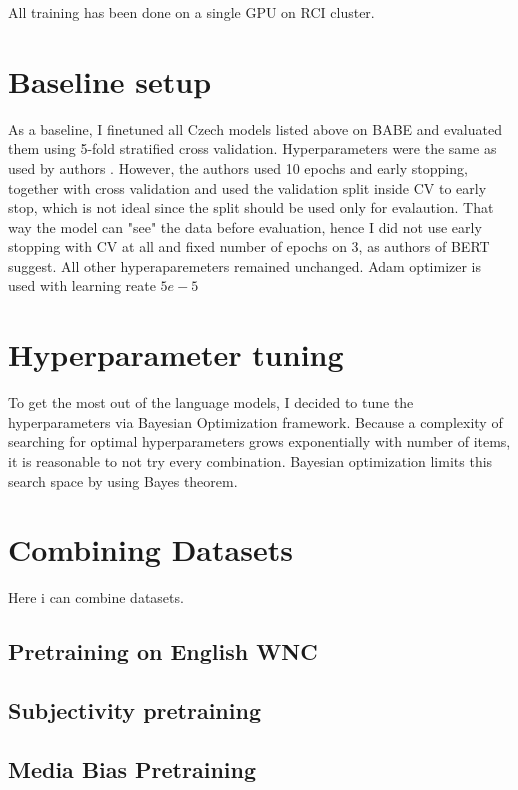  
 
 
 
All training has been done on a single GPU on RCI cluster.
 \section{Baseline setup}
 As a baseline, I finetuned all Czech models listed above on BABE and evaluated them using 5-fold stratified cross validation. Hyperparameters were the same as used by authors \cite{Spinde2021MBIC}. However, the authors used 10 epochs and early stopping, together with cross validation and used the validation split inside CV to early stop, which is not ideal since the split should be used only for evalaution. That way the model can "see" the data before evaluation, hence I did not use early stopping with CV at all and fixed number of epochs on 3, as authors of BERT \cite{devlin2019bert} suggest. 
 All other hyperaparemeters remained unchanged. Adam optimizer is used with learning reate $5e-5$
 
 
 
 
 
 \section{Hyperparameter tuning}
 To get the most out of the language models, I decided to tune the hyperparameters via Bayesian Optimization framework. Because a complexity of searching for optimal hyperparameters grows exponentially with number of items, it is reasonable to not try every combination. Bayesian optimization limits this search space by using Bayes theorem.
 
 
 
 
 \section{Combining Datasets}
 Here i can combine datasets.
 \subsection{Pretraining on English WNC}
 \subsection{Subjectivity pretraining}
 \subsection{Media Bias Pretraining}
